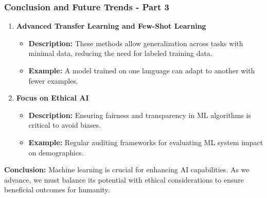 \documentclass[aspectratio=169]{beamer}
\begin{document}
\begin{frame}[fragile]
  \frametitle{Conclusion and Future Trends - Part 3}
  
  \begin{enumerate}[resume]     
      \item \textbf{Advanced Transfer Learning and Few-Shot Learning}
      \begin{itemize}
          \item \textbf{Description:} 
          These methods allow generalization across tasks with minimal data, reducing the need for labeled training data.
          \item \textbf{Example:} 
          A model trained on one language can adapt to another with fewer examples.
      \end{itemize}
      
      \item \textbf{Focus on Ethical AI}
      \begin{itemize}
          \item \textbf{Description:} 
          Ensuring fairness and transparency in ML algorithms is critical to avoid biases.
          \item \textbf{Example:} 
          Regular auditing frameworks for evaluating ML system impact on demographics.
      \end{itemize}
  \end{enumerate}

  \textbf{Conclusion:} 
  Machine learning is crucial for enhancing AI capabilities. As we advance, we must balance its potential with ethical considerations to ensure beneficial outcomes for humanity.
\end{frame}
\end{document}
